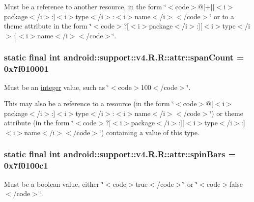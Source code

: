 Must be a reference to another resource, in the form \char`\"{}$<$code$>$@\mbox{[}+\mbox{]}\mbox{[}$<$i$>$package$<$/i$>$:\mbox{]}$<$i$>$type$<$/i$>$:$<$i$>$name$<$/i$>$$<$/code$>$\char`\"{} or to a theme attribute in the form \char`\"{}$<$code$>$?\mbox{[}$<$i$>$package$<$/i$>$:\mbox{]}\mbox{[}$<$i$>$type$<$/i$>$:\mbox{]}$<$i$>$name$<$/i$>$$<$/code$>$\char`\"{}. \hypertarget{classandroid_1_1support_1_1v4_1_1_r_1_1attr_ef23aedcf6cd79b60a7fad6fecbe4b84}{
\subsubsection[{spanCount}]{\setlength{\rightskip}{0pt plus 5cm}static final int android::support::v4.R.R::attr::spanCount = 0x7f010001}}
\label{classandroid_1_1support_1_1v4_1_1_r_1_1attr_ef23aedcf6cd79b60a7fad6fecbe4b84}


Must be an \hyperlink{classandroid_1_1support_1_1v4_1_1_r_1_1integer}{integer} value, such as \char`\"{}$<$code$>$100$<$/code$>$\char`\"{}. 

This may also be a reference to a resource (in the form \char`\"{}$<$code$>$@\mbox{[}$<$i$>$package$<$/i$>$:\mbox{]}$<$i$>$type$<$/i$>$:$<$i$>$name$<$/i$>$$<$/code$>$\char`\"{}) or theme attribute (in the form \char`\"{}$<$code$>$?\mbox{[}$<$i$>$package$<$/i$>$:\mbox{]}\mbox{[}$<$i$>$type$<$/i$>$:\mbox{]}$<$i$>$name$<$/i$>$$<$/code$>$\char`\"{}) containing a value of this type. \hypertarget{classandroid_1_1support_1_1v4_1_1_r_1_1attr_129d64d96d215ef261b955533a8921a9}{
\subsubsection[{spinBars}]{\setlength{\rightskip}{0pt plus 5cm}static final int android::support::v4.R.R::attr::spinBars = 0x7f0100c1}}
\label{classandroid_1_1support_1_1v4_1_1_r_1_1attr_129d64d96d215ef261b955533a8921a9}


Must be a boolean value, either \char`\"{}$<$code$>$true$<$/code$>$\char`\"{} or \char`\"{}$<$code$>$false$<$/code$>$\char`\"{}. 

